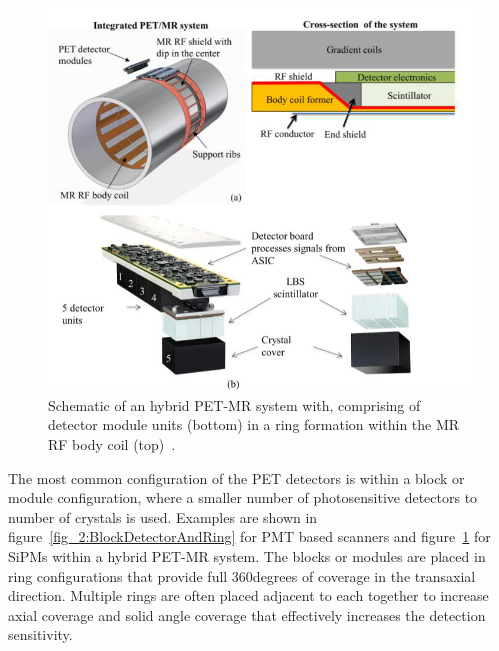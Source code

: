 \begin{figure} [h!]
\centering
\includegraphics[scale=0.45,angle=0]{2_Theory_Methods/figures/SignaPETMR_Integrated_System.png}
\caption{Schematic of an hybrid PET-MR system with, comprising of detector module units (bottom) in a ring formation within the MR RF body coil (top)~\cite{Levin2016}.} 
\label{fig_2:SignaPETMR_Integrated_System}
\end{figure} 
%
%
%
The most common configuration of the PET detectors is within a block or module configuration, where a smaller number of photosensitive detectors to number of crystals is used. Examples are shown in figure~\ref{fig_2:BlockDetectorAndRing} for PMT based scanners and figure~\ref{fig_2:SignaPETMR_Integrated_System} for SiPMs within a hybrid PET-MR system. 
The blocks or modules are placed in ring configurations that provide full 360degrees of coverage in the transaxial direction. Multiple rings are often placed adjacent to each together to increase axial coverage and solid angle coverage that effectively increases the detection sensitivity. 


